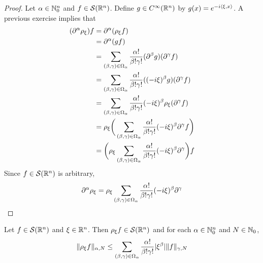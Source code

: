 \documentclass{book}
\begin{document}
	\begin{proof}
		Let $\alpha \in \mathbb{N}_0^n$ and $f \in \mathcal{S}(\mathbb{R}^n)$. Define $g \in C^{\infty}(\mathbb{R}^n)$ by $g(x) = e^{-i \langle \xi, x \rangle}$. A previous exercise implies that 
		\begin{align*}
			(\partial^{\alpha} \rho_{\xi})f
			& = \partial^{\alpha} (\rho_{\xi} f) \\
			& = \partial^{\alpha} (gf) \\
			& = \sum_{(\beta, \gamma) \in \Omega_{\alpha}} \frac{\alpha!}{\beta! \gamma!}( \partial^{\beta} g) (\partial^{\gamma} f) \\
			& = \sum_{(\beta, \gamma) \in \Omega_{\alpha}} \frac{\alpha!}{\beta! \gamma!}((-i \xi)^{\beta} g) (\partial^{\gamma} f) \\
			& = \sum_{(\beta, \gamma) \in \Omega_{\alpha}} \frac{\alpha!}{\beta! \gamma!} (-i \xi)^{\beta} \rho_{\xi}( \partial^{\gamma} f) \\
			& = \rho_{\xi} \bigg( \sum_{(\beta, \gamma) \in \Omega_{\alpha}} \frac{\alpha!}{\beta! \gamma!} (-i \xi)^{\beta}  \partial^{\gamma} f \bigg ) \\
			& = \bigg( \rho_{\xi}  \sum_{(\beta, \gamma) \in \Omega_{\alpha}} \frac{\alpha!}{\beta! \gamma!} (-i \xi)^{\beta}  \partial^{\gamma}  \bigg) f
		\end{align*}
		Since $f \in \mathcal{S}(\mathbb{R}^n)$ is arbitrary, 
		$$\partial^{\alpha} \rho_{\xi} = \rho_{\xi}  \sum_{(\beta, \gamma) \in \Omega_{\alpha}} \frac{\alpha!}{\beta! \gamma!} (-i \xi)^{\beta}  \partial^{\gamma} $$
	\end{proof}

	\begin{ex}
		Let $f \in \mathcal{S}(\mathbb{R}^n)$ and $\xi \in \mathbb{R}^n$. Then $\rho_{\xi} f \in \mathcal{S}(\mathbb{R}^n)$ and for each $\alpha \in \mathbb{N}_0^n$ and $N \in \mathbb{N}_0$, 
		$$\|\rho_{\xi}f\|_{\alpha, N} \leq \sum_{(\beta, \gamma) \in \Omega_{\alpha}} \frac{\alpha!}{\beta! \gamma!} |\xi^{\beta}|  \|f\|_{\gamma, N}$$
	\end{ex}
	
\end{document}
